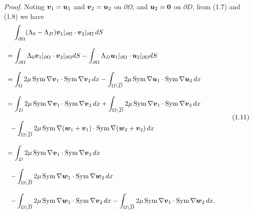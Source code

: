 {\it\noindent Proof.}
Noting $\mbox{\boldmath $v$}_1=\mbox{\boldmath $u$}_1$ and $\mbox{\boldmath $v$}_2=\mbox{\boldmath $u$}_2$ on $\partial\Omega$, and $\mbox{\boldmath $u$}_2=\mbox{\boldmath $0$}$ on $\partial D$, from (1.7) and (1.8) we have
$$\begin{array}{l}
\displaystyle
\,\,\,\,\,\,
\int_{\partial\Omega}(\Lambda_0-\Lambda_D)\mbox{\boldmath $v$}_1
\vert_{\partial\Omega}\cdot\mbox{\boldmath $v$}_2\vert_{\partial\Omega}\,dS
\\
\\
\displaystyle
=\int_{\partial\Omega}\Lambda_0\mbox{\boldmath $v$}_1\vert_{\partial\Omega}\cdot\mbox{\boldmath $v$}_2\vert_{\partial\Omega}dS
-\int_{\partial\Omega}\Lambda_D\mbox{\boldmath $u$}_1\vert_{\partial\Omega}\cdot\mbox{\boldmath $u$}_2\vert_{\partial\Omega}dS
\\
\\
\displaystyle
=\int_{\Omega}2\mu\,\text{Sym}\,\nabla\mbox{\boldmath $v$}_1\cdot
\text{Sym}\,\nabla\mbox{\boldmath $v$}_2\,dx
-\int_{\Omega\setminus\overline{D}}2\mu\,\text{Sym}\,\nabla\mbox{\boldmath $u$}_1\cdot
\text{Sym}\,\nabla\mbox{\boldmath $u$}_2\,dx
\\
\\
\displaystyle
=\int_{D}2\mu\,\text{Sym}\,\nabla\mbox{\boldmath $v$}_1\cdot
\text{Sym}\,\nabla\mbox{\boldmath $v$}_2\,dx
+\int_{\Omega\setminus\overline{D}}2\mu\,\text{Sym}\,\nabla\mbox{\boldmath $v$}_1\cdot
\text{Sym}\,\nabla\mbox{\boldmath $v$}_2\,dx
\\
\\
\displaystyle
\,\,\,
-\int_{\Omega\setminus\overline{D}}2\mu\,
\text{Sym}\,\nabla(\mbox{\boldmath $w$}_1+\mbox{\boldmath $v$}_1)\cdot
\text{Sym}\,\nabla(\mbox{\boldmath $w$}_2+\mbox{\boldmath $v$}_2)\,dx\\
\\
\displaystyle
=\int_{D}2\mu\,\text{Sym}\,\nabla\mbox{\boldmath $v$}_1\cdot
\text{Sym}\,\nabla\mbox{\boldmath $v$}_2\,dx
\\
\\
\displaystyle
\,\,\,
-\int_{\Omega\setminus\overline{D}}2\mu\,
\text{Sym}\,\nabla\mbox{\boldmath $w$}_1\cdot
\text{Sym}\,\nabla\mbox{\boldmath $w$}_2\,dx
\\
\\
\displaystyle
\,\,\,
-\int_{\Omega\setminus\overline{D}}2\mu\,
\text{Sym}\,\nabla\mbox{\boldmath $w$}_1\cdot
\text{Sym}\,\nabla\mbox{\boldmath $v$}_2\,dx
-\int_{\Omega\setminus\overline{D}}2\mu\,
\text{Sym}\,\nabla\mbox{\boldmath $v$}_1\cdot
\text{Sym}\,\nabla\mbox{\boldmath $w$}_2\,dx.
\end{array}
\tag {1.11}
$$
